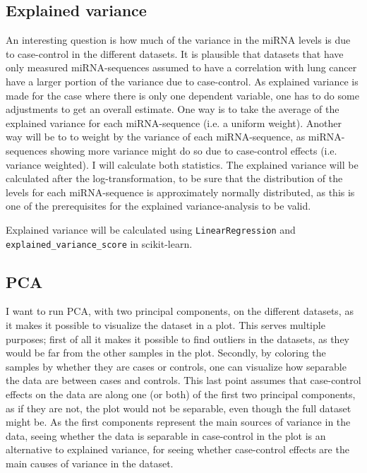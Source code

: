 \subsection{Explained variance}
An interesting question is how much of the variance in the miRNA levels is due to case-control in the different datasets. It is plausible that datasets that have only measured miRNA-sequences assumed to have a correlation with lung cancer have a larger portion of the variance due to case-control. As explained variance is made for the case where there is only one dependent variable, one has to do some adjustments to get an overall estimate. One way is to take the average of the explained variance for each miRNA-sequence (i.e. a uniform weight). Another way will be to to weight by the variance of each miRNA-sequence, as miRNA-sequences showing more variance might do so due to case-control effects (i.e. variance weighted). I will calculate both statistics. The explained variance will be calculated after the log-transformation, to be sure that the distribution of the levels for each miRNA-sequence is approximately normally distributed, as this is one of the prerequisites for the explained variance-analysis to be valid.

Explained variance will be calculated using \verb|LinearRegression| and \\ \verb|explained_variance_score| in scikit-learn.

\subsection{PCA}
I want to run PCA, with two principal components, on the different datasets, as it makes it possible to visualize the dataset in a plot. This serves multiple purposes; first of all it makes it possible to find outliers in the datasets, as they would be far from the other samples in the plot. Secondly, by coloring the samples by whether they are cases or controls, one can visualize how separable the data are between cases and controls. This last point assumes that case-control effects on the data are along one (or both) of the first two principal components, as if they are not, the plot would not be separable, even though the full dataset might be. As the first components represent the main sources of variance in the data, seeing whether the data is separable in case-control in the plot is an alternative to explained variance, for seeing whether case-control effects are the main causes of variance in the dataset.

